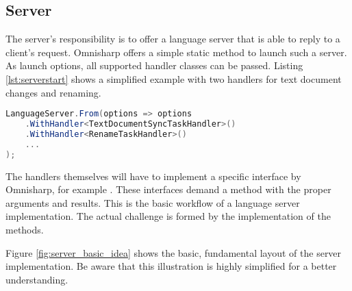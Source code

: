



\subsection{Server}
The server's responsibility is to offer a language server that is able to reply to a client's request.
Omnisharp offers a simple static method to launch such a server.
As launch options, all supported handler classes can be passed.
Listing \ref{lst:serverstart} shows a simplified example with two handlers for text document changes and renaming.

\begin{lstlisting}[language=csharp, caption={Language Server Initialization}, captionpos=b, label={lst:serverstart}]
LanguageServer.From(options => options
    .WithHandler<TextDocumentSyncTaskHandler>()
    .WithHandler<RenameTaskHandler>()
    ...
);
\end{lstlisting}

The handlers themselves will have to implement a specific interface by Omnisharp, for example .
These interfaces demand a  method with the proper arguments and results.
This is the basic workflow of a language server implementation.
The actual challenge is formed by the implementation of the  methods.

Figure \ref{fig:server_basic_idea} shows the basic, fundamental layout of the server implementation.
Be aware that this illustration is highly simplified for a better understanding.

